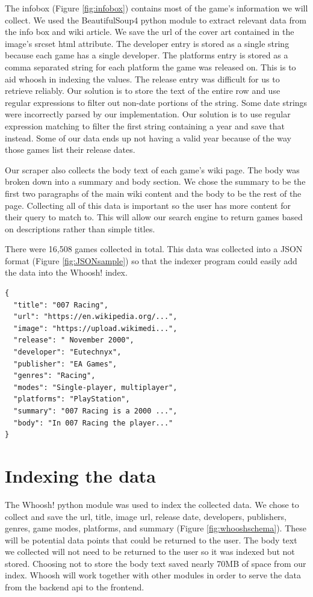 The infobox (Figure \ref{fig:infobox}) contains most of the game's information we will collect. We used the BeautifulSoup4 python module to extract relevant data from the info box and wiki article. We save the url of the cover art contained in the image's srcset html attribute. The developer entry is stored as a single string because each game has a single developer. The platforms entry is stored as a comma separated string for each platform the game was released on. This is to aid whoosh in indexing the values. The release entry was difficult for us to retrieve reliably. Our solution is to store the text of the entire row and use regular expressions to filter out non-date portions of the string. Some date strings were incorrectly parsed by our implementation. Our solution is to use regular expression matching to filter the first string containing a year and save that instead. Some of our data ends up not having a valid year because of the way those games list their release dates. 

Our scraper also collects the body text of each game's wiki page. The body was broken down into a summary and body section. We chose the summary to be the first two paragraphs of the main wiki content and the body to be the rest of the page. Collecting all of this data is important so the user has more content for their query to match to. This will allow our search engine to return games based on descriptions rather than simple titles. 

There were 16,508 games collected in total. This data was collected into a JSON format (Figure \ref{fig:JSONsample}) so that the indexer program could easily add the data into the Whoosh! index.

\begin{minipage}[H]{0.4\textwidth}
\begin{verbatim}
{
  "title": "007 Racing",                
  "url": "https://en.wikipedia.org/...",
  "image": "https://upload.wikimedi...",
  "release": " November 2000",          
  "developer": "Eutechnyx",             
  "publisher": "EA Games",              
  "genres": "Racing",                   
  "modes": "Single-player, multiplayer",
  "platforms": "PlayStation",           
  "summary": "007 Racing is a 2000 ...",
  "body": "In 007 Racing the player..."
}
\end{verbatim}
\label{fig:JSONsample}
\end{minipage}

\section{Indexing the data}
The Whoosh! python module was used to index the collected data. We chose to collect and save the url, title, image url, release date, developers, publishers, genres, game modes, platforms, and summary (Figure \ref{fig:whooshschema}). These will be potential data points that could be returned to the user. The body text we collected will not need to be returned to the user so it was indexed but not stored. Choosing not to store the body text saved nearly 70MB of space from our index. Whoosh will work together with other modules in order to serve the data from the backend api to the frontend.

